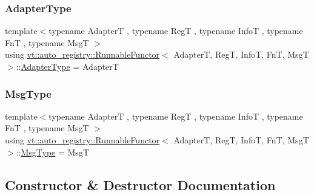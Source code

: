 \subsubsection{\texorpdfstring{Adapter\+Type}{AdapterType}}
{\footnotesize\ttfamily template$<$typename AdapterT , typename RegT , typename InfoT , typename FnT , typename MsgT $>$ \\
using \hyperlink{structvt_1_1auto__registry_1_1_runnable_functor}{vt\+::auto\+\_\+registry\+::\+Runnable\+Functor}$<$ AdapterT, RegT, InfoT, FnT, MsgT $>$\+::\hyperlink{structvt_1_1auto__registry_1_1_runnable_functor_adfb8bb866924c02571131349c69a5a1b}{Adapter\+Type} =  AdapterT}

\mbox{\label{structvt_1_1auto__registry_1_1_runnable_functor_ab1990f958c35309ebb8be7de8baf4312}} 
\subsubsection{\texorpdfstring{Msg\+Type}{MsgType}}
{\footnotesize\ttfamily template$<$typename AdapterT , typename RegT , typename InfoT , typename FnT , typename MsgT $>$ \\
using \hyperlink{structvt_1_1auto__registry_1_1_runnable_functor}{vt\+::auto\+\_\+registry\+::\+Runnable\+Functor}$<$ AdapterT, RegT, InfoT, FnT, MsgT $>$\+::\hyperlink{structvt_1_1auto__registry_1_1_runnable_functor_ab1990f958c35309ebb8be7de8baf4312}{Msg\+Type} =  MsgT}



\subsection{Constructor \& Destructor Documentation}
\mbox{\label{structvt_1_1auto__registry_1_1_runnable_functor_a939a7cf3315f01bfcfd182e73073dc6b}} 
